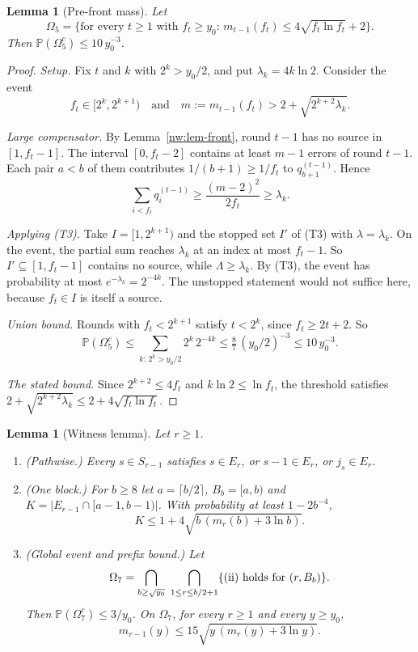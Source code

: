 \documentclass[11pt]{amsart}
\newtheorem{lemma}[theorem]{Lemma}
\theoremstyle{definition}
\theoremstyle{remark}
\newcommand{\PP}{\mathbb{P}}
\begin{document}
\begin{lemma}[Pre-front mass]\label{nw:lem-prefront}
Let
\[
  \Omega_5=\bigl\{\text{for every $t\ge1$ with $f_t\ge y_0$: }
  m_{t-1}(f_t)\le4\sqrt{f_t\ln f_t}+2\bigr\}.
\]
Then $\PP(\Omega_5^c)\le10\,y_0^{-3}$.
\end{lemma}

\begin{proof}
\emph{Setup.} Fix $t$ and $k$ with $2^k>y_0/2$, and put $\lambda_k=4k\ln2$.
Consider the event
\[
  f_t\in[2^k,2^{k+1})\quad\text{and}\quad
  m:=m_{t-1}(f_t)>2+\sqrt{2^{k+2}\lambda_k}.
\]

\emph{Large compensator.} By Lemma~\ref{nw:lem-front}, round $t-1$ has no
source in $[1,f_t-1]$. The interval $[0,f_t-2]$ contains at least $m-1$
errors of round $t-1$. Each pair $a<b$ of them contributes
$1/(b+1)\ge1/f_t$ to $q^{(t-1)}_{b+1}$. Hence
\[
  \sum_{i<f_t}q^{(t-1)}_i\ge\frac{(m-2)^2}{2f_t}\ge\lambda_k.
\]

\emph{Applying \textup{(T3)}.} Take $I=[1,2^{k+1})$ and the stopped set $I'$
of (T3) with $\lambda=\lambda_k$. On the event, the partial sum reaches
$\lambda_k$ at an index at most $f_t-1$. So $I'\subseteq[1,f_t-1]$ contains
no source, while $\Lambda\ge\lambda_k$. By (T3), the event has probability at
most $e^{-\lambda_k}=2^{-4k}$. The unstopped statement would not suffice
here, because $f_t\in I$ is itself a source.

\emph{Union bound.} Rounds with $f_t<2^{k+1}$ satisfy $t<2^k$, since
$f_t\ge2t+2$. So
\[
  \PP(\Omega_5^c)\le\sum_{k:\,2^k>y_0/2}2^k\,2^{-4k}
  \le\tfrac87\,(y_0/2)^{-3}\le10\,y_0^{-3}.
\]

\emph{The stated bound.} Since $2^{k+2}\le4f_t$ and $k\ln2\le\ln f_t$, the
threshold satisfies $2+\sqrt{2^{k+2}\lambda_k}\le2+4\sqrt{f_t\ln f_t}$.
\end{proof}

\begin{lemma}[Witness lemma]\label{nw:lem-witness}
Let $r\ge1$.
\begin{enumerate}[label=\textup{(\roman*)},leftmargin=*]
\item \textup{(Pathwise.)} Every $s\in S_{r-1}$ satisfies $s\in E_r$, or
  $s-1\in E_r$, or $j_s\in E_r$.
\item \textup{(One block.)} For $b\ge8$ let $a=\lceil b/2\rceil$, $B_b=[a,b)$
  and $K=|E_{r-1}\cap[a-1,b-1)|$. With probability at least $1-2b^{-4}$,
  \[
    K\le1+4\sqrt{b\,(m_r(b)+3\ln b)}.
  \]
\item \textup{(Global event and prefix bound.)} Let
  \[
    \Omega_7=\bigcap_{b\ge\sqrt{y_0}}\ \bigcap_{1\le r\le b/2+1}
    \{\text{\textup{(ii)} holds for $(r,B_b)$}\}.
  \]
  Then $\PP(\Omega_7^c)\le3/y_0$. On $\Omega_7$, for every $r\ge1$ and every
  $y\ge y_0$,
  \[
    m_{r-1}(y)\le15\sqrt{y\,(m_r(y)+3\ln y)}.
  \]
\end{enumerate}
\end{lemma}
\end{document}
